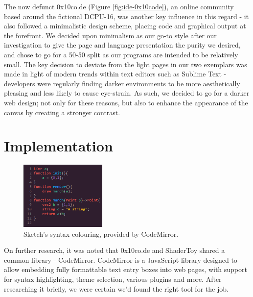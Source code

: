 \documentclass{l3proj}
\begin{document}
The now defunct 0x10co.de (Figure \ref{fig:ide-0x10code}), an online community based around the fictional DCPU-16, was another key influence in this regard - it also followed a minimalistic design scheme, placing code and graphical output at the forefront. We decided upon minimalism as our go-to style after our investigation to give the page and language presentation the purity we desired, and chose to go for a 50-50 split as our programs are intended to be relatively small. The key decision to deviate from the light pages in our two exemplars was made in light of modern trends within text editors such as Sublime Text - developers were regularly finding darker environments to be more aesthetically pleasing and less likely to cause eye-strain. As such, we decided to go for a darker web design; not only for these reasons, but also to enhance the appearance of the canvas by creating a stronger contrast.

\section{Implementation}
\label{ide-impl}
\begin{figure}
  \centering
  \includegraphics[width=0.38\textwidth]{images/sketch-syntax}
  \caption{Sketch's syntax colouring, provided by CodeMirror.}
  \label{fig:ide-syntax}
\end{figure}
On further research, it was noted that 0x10co.de and ShaderToy shared a common library - CodeMirror. CodeMirror is a JavaScript library designed to allow embedding fully formattable text entry boxes into web pages, with support for syntax highlighting, theme selection, various plugins and more. After researching it briefly, we were certain we'd found the right tool for the job.
\end{document}
